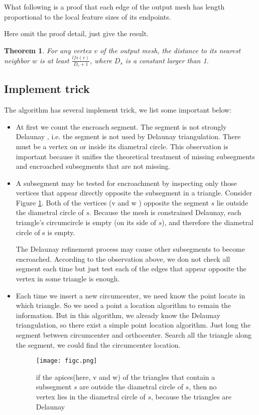 \documentclass[letterpaper,12pt]{article}
\newtheorem{theorem}[lemma]{Theorem}
\begin{document}
What following is a proof that each edge of the output mesh has length proportional to the local
feature sizes of its endpoints. 

Here omit the proof detail, just give the result.

\begin{theorem} 
  For any vertex $v$ of the output mesh, the distance to its nearest neighbor $w$ is at least
  $\frac{lfs(v)}{D_s+1}$, where $D_s$ is a constant larger than 1. 
\end{theorem}

\subsection{Implement trick}
\label{sec:01:04}
The algorithm has several implement trick, we list some important below:
\begin{itemize}
\item At first we count the encroach segment. The segment is not strongly Delaunay , i.e. the
  segment is not used by Delaunay triangulation. There must be a vertex on or inside its diametral  
  circle. This observation is important because it unifies the theoretical treatment of missing
  subsegments and encroached subsegments that are not missing.

\item A subsegment may be tested for encroachment by inspecting only those vertices that appear
  directly opposite the subsegment in a triangle. Consider Figure \ref{fig:c}. Both of the vertices
  (v and w ) opposite the segment $s$ lie outside the diametral circle of $s$. Because the mesh is
  constrained Delaunay, each triangle's circumcircle is empty (on its side of $s$), and therefore
  the diametral circle of s is empty. 
  
  The Delaunay refinement process may cause other subsegments to become encroached. According to the
  observation above, we don not check all segment each time but just test each of the edges that
  appear opposite the vertex in some triangle is enough. 

\item Each time we insert a new circumcenter, we need know the point locate in which triangle. So we
  need a point a location algorithm to remain the information. But in this algorithm, we already
  know the Delaunay triangulation, so there exist a simple point location algorithm. Just long the
  segment between circumcenter and orthocenter. Search all the triangle along the segment, we could
  find the circumcenter location. 


  \begin{figure}[!htb]
    \centering
    \texttt{[image: figc.png]}
    \caption{if the apices(here, v and w) of the triangles that contain a subsegment $s$ are outside the diametral circle of $s$, then no vertex lies in the diametral circle of $s$, because the triangles are Delaunay}
    \label{fig:c}
  \end{figure}

\end{itemize}
\end{document}
